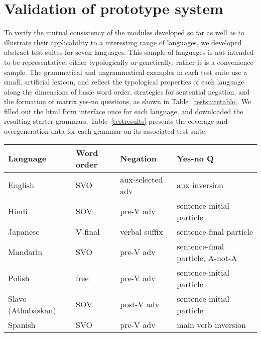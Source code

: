 \documentclass[11pt]{article}
\begin{document}
\section{Validation of prototype system}


To verify the mutual consistency of the modules developed so far as
well as to illustrate their applicability to a interesting range of
languages, we developed abstract test suites for seven languages.
This sample of languages is not intended to be representative, either
typologically or genetically; rather it is a convenience sample.  The
grammatical and ungrammatical examples in each test suite use a small,
artificial lexicon, and reflect the typological properties of each
language along the dimensions of basic word order, strategies for
sentential negation, and the formation of matrix yes-no questions, as
shown in Table~\ref{testsuitetable}. We filled out the html form interface once for each language,
and downloaded the resulting starter grammars.  Table~\ref{testresults}
presents the coverage and overgeneration data for each grammar on
its associated test suite.

\begin{table*}[ht]
\begin{center}
\small
\begin{tabular}{llll}
\hline
Language\footnotemark & Word order & Negation & Yes-no Q\footnotemark \\ \hline
English  & SVO	      & aux-selected adv& aux inversion \\
Hindi    & SOV        & pre-V adv 	& sentence-initial particle\\
Japanese & V-final    & verbal suffix   & sentence-final particle\\
Mandarin & SVO	      & pre-V adv	& sentence-final particle, A-not-A \\
Polish   & free	      & pre-V adv       & sentence-initial particle  \\
Slave (Athabaskan) & SOV & post-V adv	& sentence-initial particle \\
Spanish  & SVO	      & pre-V adv	& main verb inversion \\ \hline
\end{tabular}
\end{center}
\caption{Languages used in testing}
\label{testsuitetable}
\end{table*}

\addtocounter{footnote}{-1}
\addtocounter{footnote}{1}
\end{document}
